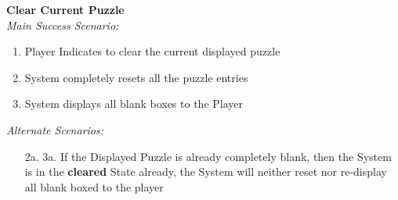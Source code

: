 \documentclass[letterpaper]{article}
\begin{document}
\noindent
\textbf{Clear Current Puzzle}\\
\textit{Main Success Scenario:  }
\begin{enumerate}
\item Player Indicates to clear the current displayed puzzle
\item System completely resets all the puzzle entries
\item System displays all blank boxes to the Player
\end{enumerate}
\textit{Alternate Scenarios:}
\begin{itemize}
\item[2a. 3a.] If the Displayed Puzzle is already completely blank,
then the System is in the \textbf{cleared} State already, the System
will neither reset nor re-display all blank boxed to the player
\end{itemize}
\end{document}
